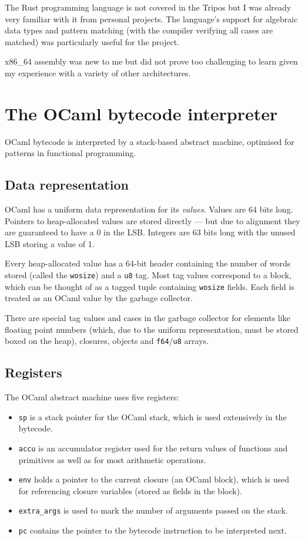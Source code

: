 The Rust programming language is not covered in the Tripos but I was already very familiar with
it from personal projects. The language's support for algebraic data types and pattern matching
(with the compiler verifying all cases are matched) was particularly useful for the project.

x86\_64 assembly was new to me but did not prove too challenging to learn given my experience with
a variety of other architectures.

\section{The OCaml bytecode interpreter}

OCaml bytecode is interpreted by a stack-based abstract machine, optimised for patterns in
functional programming.

\subsection{Data representation}

OCaml has a uniform data representation for its \emph{values}. Values are 64 bits long.
Pointers to heap-allocated values are stored directly --- but due to alignment they are guaranteed
to
have a 0 in
the LSB. Integers are 63 bits long with the unused LSB storing a value of 1.

Every heap-allocated value has a 64-bit header containing the number of words stored (called
the \texttt{wosize}) and a \texttt{u8} tag. Most tag values correspond to a block, which can be
thought of as a tagged tuple containing \texttt{wosize} fields. Each field is treated as an OCaml
value by the garbage collector.

There are special tag values and cases in the garbage collector for elements like floating point
numbers (which, due to the uniform representation, must be stored boxed on the heap),
closures, objects and \texttt{f64}/\texttt{u8} arrays.

\subsection{Registers}

The OCaml abstract machine uses five registers:

\begin{itemize}
    \item \texttt{sp} is a stack pointer for the OCaml stack, which is used extensively
          in the bytecode.
    \item \texttt{accu} is an accumulator register used for the return values of functions
          and primitives as well as for most arithmetic operations.
    \item \texttt{env} holds a pointer to the current closure (an OCaml block), which is used for
          referencing closure variables (stored as fields in the block).
    \item \texttt{extra\_args} is used to mark the number of arguments passed on the stack.
    \item \texttt{pc} contains the pointer to the bytecode instruction to be interpreted next.
\end{itemize}

